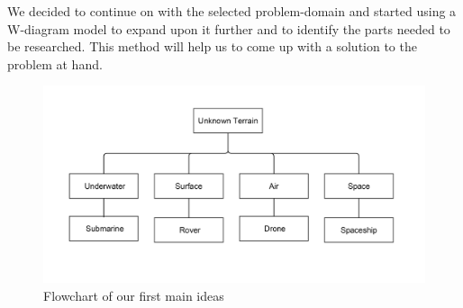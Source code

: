 We decided to continue on with the selected problem-domain and started using a W-diagram model to expand upon it further and to identify the parts needed to be researched. This method will help us to come up with a solution to the problem at hand.

\begin{figure}[!h]
	\centering
	\includegraphics[scale=.1]{images/level1.png}
	\caption{Flowchart of our first main ideas}
	\label{fig:level1}
\end{figure}